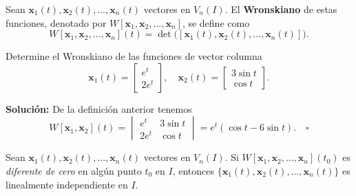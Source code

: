 \begin{definition}
Sean $\mathbf{x}_1(t),\mathbf{x}_2(t),\dots,\mathbf{x}_n(t)$ vectores en $V_n(I)$. El \textbf{Wronskiano} de estas funciones, denotado por $W[\mathbf{x}_1,\mathbf{x}_2,\dots,\mathbf{x}_n]$, se define como
\[
W[\mathbf{x}_1,\mathbf{x}_2,\dots,\mathbf{x}_n](t)=\det\big([\mathbf{x}_1(t),\mathbf{x}_2(t),\dots,\mathbf{x}_n(t)]\big).
\]
\end{definition}

\begin{example}
Determine el Wronskiano de las funciones de vector columna
\[
\mathbf{x}_1(t) = \begin{bmatrix} e^t \\ 2e^t \end{bmatrix}, \quad \mathbf{x}_2(t) = \begin{bmatrix} 3 \sin t \\ \cos t \end{bmatrix}.
\]

\textbf{Soluci\'on:} De la definici\'on anterior tenemos
\[
W[\mathbf{x}_1, \mathbf{x}_2](t) = \begin{vmatrix} e^t & 3 \sin t \\ 2e^t & \cos t \end{vmatrix} = e^t (\cos t - 6 \sin t). \quad \square
\]
\end{example}

\begin{theorem}\label{thm:wronskiano}
Sean $\mathbf{x}_1(t), \mathbf{x}_2(t), \dots, \mathbf{x}_n(t)$ vectores en $V_n(I)$. Si $W[\mathbf{x}_1, \mathbf{x}_2, \dots, \mathbf{x}_n](t_0)$ es \textit{diferente de cero} en alg\'un punto $t_0$ en $I$, entonces $\{\mathbf{x}_1(t), \mathbf{x}_2(t), \dots, \mathbf{x}_n(t)\}$ es linealmente independiente en $I$.
\end{theorem}

